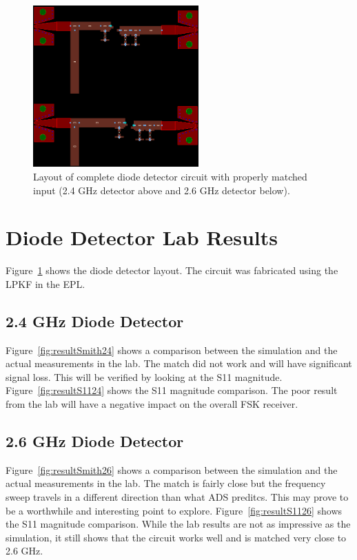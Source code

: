 \documentclass[conference]{IEEEtran}
\begin{document}
\begin{figure}[!htb]
\centering
\includegraphics[width=2.5in]{diode-pics/diodedetectorlayout.png}
\caption{Layout of complete diode detector circuit with properly matched input (2.4 GHz detector above and 2.6 GHz detector below).}
\label{fig:FinalDDLayout}
\end{figure}

\section{Diode Detector Lab Results}
Figure~\ref{fig:FinalDDLayout} shows the diode detector layout. The circuit was fabricated using the LPKF in the EPL.
\subsection{2.4 GHz Diode Detector}
Figure~\ref{fig:resultSmith24} shows a comparison between the simulation and the actual measurements in the lab. The match did not work and will have significant signal loss. This will be verified by looking at the S11 magnitude. Figure~\ref{fig:resultS1124} shows the S11 magnitude comparison. The poor result from the lab will have a negative impact on the overall FSK receiver.
\subsection{2.6 GHz Diode Detector}
Figure~\ref{fig:resultSmith26} shows a comparison between the simulation and the actual measurements in the lab. The match is fairly close but the frequency sweep travels in a different direction than what ADS preditcs. This may prove to be a worthwhile and interesting point to explore. Figure~\ref{fig:resultS1126} shows the S11 magnitude comparison. While the lab results are not as impressive as the simulation, it still shows that the circuit works well and is matched very close to 2.6 GHz.
\end{document}
